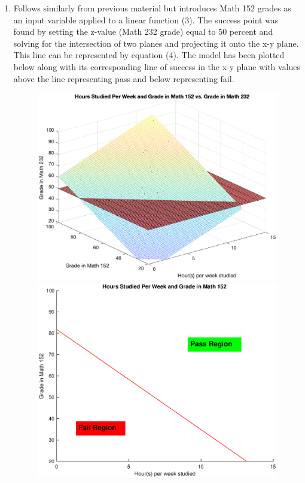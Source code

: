 \documentclass[10pt]{article}
\begin{document}
\begin{enumerate}[leftmargin=\labelsep]
\begin{figure}[h]
\begin{minipage}[c]{0.48\linewidth}
        \end{minipage}%
    \end{figure}

    \item Follows similarly from previous material but introduces Math 152 grades as an input variable applied to a linear function (3). The success point was found by setting the z-value (Math 232 grade) equal to 50 percent and solving for the intersection of two planes and projecting it onto the x-y plane.
    This line can be represented by equation (4). The model has been plotted below along with its corresponding line of success in the x-y plane with values above the line representing pass and below representing fail.

    \begin{figure}[h]
        \begin{minipage}[c]{0.48\linewidth}
        \includegraphics[width=\linewidth]{Multivariate.eps}
        \end{minipage}
        \hfill
        \begin{minipage}[c]{0.48\linewidth}
        \includegraphics[width=\linewidth]{SuccessLine.eps}

\end{minipage}
\end{figure}
\end{enumerate}
\end{document}
